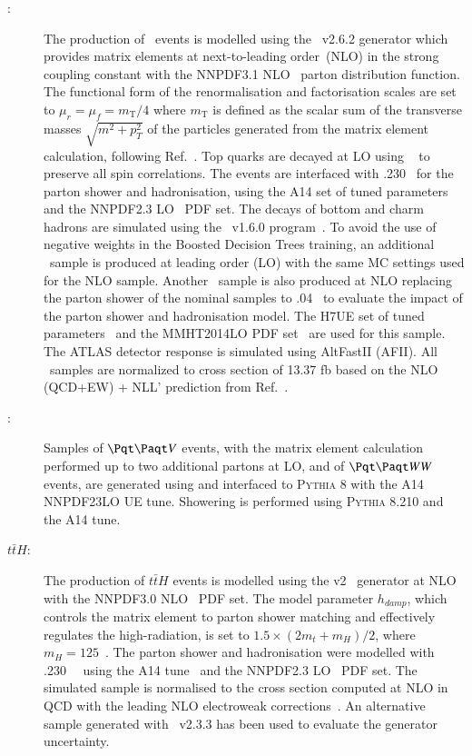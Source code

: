 \begin{description}
\item[\tttt:] The production of \tttt\ events is modelled using the \amcatnlo~v2.6.2 \cite{Alwall:2014hca} generator which provides matrix elements at next-to-leading order~(NLO) in the strong coupling constant \alphas with the NNPDF3.1 NLO~\cite{Ball_2017} parton distribution function.
The functional form of the renormalisation and factorisation scales are set to $\mu_r=\mu_f=m_\textrm{T}/4$ where $m_\textrm{T}$ is defined as the scalar sum of the transverse masses $\sqrt{m^2+p^2_{T}}$  of the particles generated from the matrix element calculation, following Ref.~\cite{Frederix:2017wme}.
Top quarks are decayed at LO using \madspin~\cite{Frixione:2007zp,Artoisenet:2012st} to preserve all spin correlations.
The events are interfaced with \pythiaeight.230~\cite{Sjostrand:2014zea} for the parton shower and hadronisation, using the A14 set of tuned parameters~\cite{ATL-PHYS-PUB-2014-021} and the NNPDF2.3 LO~\cite{Ball_2013} PDF set.
The decays of bottom and charm hadrons are simulated using the \EvtGen\ v1.6.0 program~\cite{EvtGen}.
To avoid the use of negative weights in the Boosted Decision Trees training, an additional \tttt\ sample is produced at leading order (LO) with the same MC settings used for the NLO sample. 
Another \tttt\ sample is also produced at NLO replacing the parton shower of the nominal samples to \herwigseven.04~\cite{Bahr:2008pv,Bellm:2015jjp} to evaluate the impact of the parton shower and hadronisation model. The H7UE set of tuned parameters~\cite{Bellm:2015jjp} and the MMHT2014LO PDF set~\cite{Harland-Lang:2014zoa} are used for this sample. The ATLAS detector response is simulated using AltFastII (AFII). 
All \tttt\ samples are normalized to cross section of 13.37 fb based on the NLO (QCD+EW) + NLL' prediction from Ref.~\cite{vanBeekveld:2022hty}.


\item[\ttV:]  
Samples of $\ttbar V$ events, with the matrix element calculation performed up to two additional partons at LO, and of  $\ttbar WW$ events,
are generated using {\MadG} and interfaced to \textsc{Pythia} 8 with the A14 NNPDF23LO UE tune. 
Showering is performed using \textsc{Pythia} 8.210 and the A14 tune.

\item[$t\bar tH$:] The production of $t\bar tH$ events is modelled using the \powheg v2~\cite{Frixione:2007nw,Nason:2004rx,Frixione:2007vw,Alioli:2010xd} generator at NLO with the NNPDF3.0 NLO~\cite{Ball:2014uwa} PDF set. The \powheg model parameter $h_{damp}$, which controls the matrix element to parton shower matching and effectively regulates the high-\pT  radiation, is set to $1.5\times ( 2m_t +m_H)/2$, where $m_H=125$~\GeV. 
The parton shower and hadronisation were modelled with  \pythiaeight.230~\cite{Sjostrand:2014zea}~ using the A14 tune~\cite{ATL-PHYS-PUB-2014-021} and the NNPDF2.3 LO~\cite{Ball_2013} PDF set.  The simulated sample is normalised to the cross section computed at NLO in QCD with the leading NLO electroweak corrections~\cite{Frixione:2015zaa,deFlorian:2227475}. An alternative sample generated with \amcatnlo~v2.3.3 has been used to evaluate the generator uncertainty. 



\end{description}
